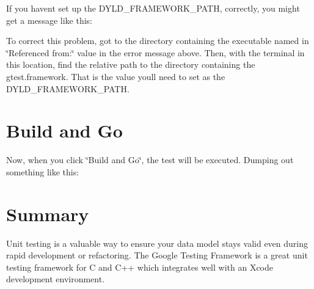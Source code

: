 If you haven\textquotesingle{}t set up the D\+Y\+L\+D\+\_\+\+F\+R\+A\+M\+E\+W\+O\+R\+K\+\_\+\+P\+A\+TH, correctly, you might get a message like this\+:


\begin{DoxyCode}{0}
\end{DoxyCode}


To correct this problem, got to the directory containing the executable named in \char`\"{}\+Referenced from\+:\char`\"{} value in the error message above. Then, with the terminal in this location, find the relative path to the directory containing the gtest.\+framework. That is the value you\textquotesingle{}ll need to set as the D\+Y\+L\+D\+\_\+\+F\+R\+A\+M\+E\+W\+O\+R\+K\+\_\+\+P\+A\+TH.

\section*{Build and Go}

Now, when you click \char`\"{}\+Build and Go\char`\"{}, the test will be executed. Dumping out something like this\+:


\begin{DoxyCode}{0}
\DoxyCodeLine{}
\end{DoxyCode}


\section*{Summary}

Unit testing is a valuable way to ensure your data model stays valid even during rapid development or refactoring. The Google Testing Framework is a great unit testing framework for C and C++ which integrates well with an Xcode development environment. 